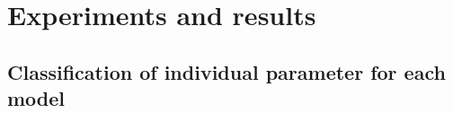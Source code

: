 \section{Experiments and results}\label{sec:experiments}

\subsection{Classification of individual parameter for each model}

